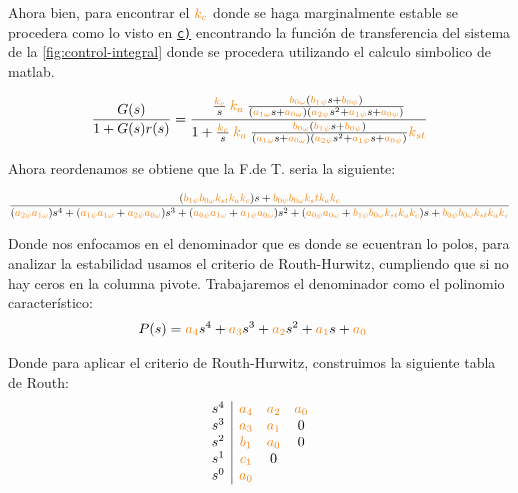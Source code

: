 Ahora bien,  para encontrar el $\nara{k_c}$ donde se haga marginalmente estable se procedera como lo visto en \hyperref[pregunta-c]{\texttt{c)}} encontrando la función de transferencia del sistema de la \autoref{fig:control-integral} donde se procedera utilizando el calculo simbolico de matlab. 

\begin{equation}
  \frac{G(s)}{1 + G(s)r(s)} = \dfrac{\frac{\nara{k_c}}{s}\nara{k_a} \frac{\nara{\nara{b_{0\omega}}}\left(\nara{b_{1\psi}}s + \nara{b_{0\psi}}\right)}
  {\left(\nara{a_{1\omega}}s + \nara{a_{0\omega}}\right)\left(\nara{a_{2\psi}}s^{2} + \nara{a_{1\psi}}s + \nara{a_{0\psi}}\right)}}
  {1+\frac{\nara{k_c}}{s} \nara{k_a} \frac{\nara{\nara{b_{0\omega}}}\left(\nara{b_{1\psi}}s + \nara{b_{0\psi}}\right)}
  {\left(\nara{a_{1\omega}}s + \nara{a_{0\omega}}\right)\left(\nara{a_{2\psi}}s^{2} + \nara{a_{1\psi}}s + \nara{a_{0\psi}}\right)}\nara{k_{st}}}
\end{equation}

Ahora reordenamos se obtiene que la F.de T. seria la siguiente:


\begin{equation}
  \dfrac{(\nara{b_{1\psi} b_{0\omega} k_{st} k_a k_c})s + \nara{b_{0\psi} b_{0\omega}k_st k_a k_c}}
  {(\nara{a_{2\psi} a_{1\omega}}) s^4 +
  (\nara{a_{1\psi} a_{1\omega}} + \nara{a_{2\psi} a_{0\omega}}) s^3 + 
  (\nara{a_{0\psi} a_{1\omega}} + \nara{a_{1\psi} a_{0\omega}}) s^2 + 
  (\nara{a_{0\psi} a_{0\omega}} + \nara{b_{1\psi} b_{0\omega}k_{st} k_a k_c})s+ 
  \nara{b_{0\psi} b_{0\omega} k_{st} k_a k_c}}
\end{equation}

Donde nos enfocamos en el denominador que es donde se ecuentran lo polos, para analizar la estabilidad usamos el criterio de Routh-Hurwitz, cumpliendo que si no hay ceros en la columna pivote. Trabajaremos el denominador como el polinomio característico:
\begin{align}
    P(s) = \nara{a_4} s^4 + \nara{a_3} s^3 + \nara{a_2} s^2 + \nara{a_1} s + \nara{a_0} &
\end{align}

Donde para aplicar el criterio de Routh-Hurwitz, construimos la siguiente tabla de Routh:
\[
\begin{array}{c|ccc}
s^4 & \nara{a_4} & \nara{a_2} & \nara{a_0} \\
s^3 & \nara{a_3} & \nara{a_1} & 0\\
s^2 & \nara{b_1} & \nara{a_0} & 0\\
s^1 & \nara{c_1} & 0 \\
s^0 & \nara{a_0} & 
\end{array}
\]



